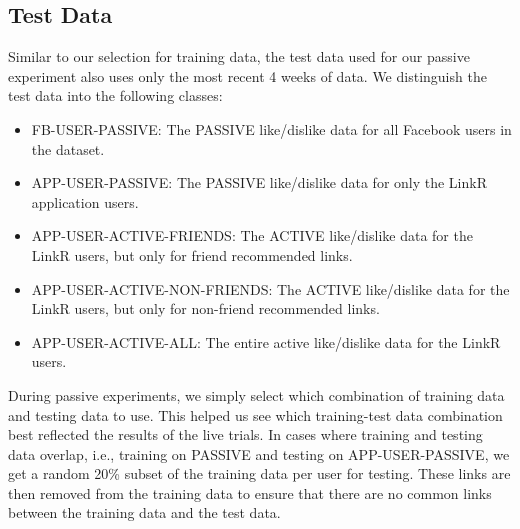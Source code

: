 \subsection{Test Data}

Similar to our selection for training data, the test data used for our passive experiment also uses only the most recent 4 weeks of data. We distinguish the test data into the following classes:

\begin{itemize}
\item{FB-USER-PASSIVE: The PASSIVE like/dislike data for all Facebook users in the dataset.}
\item{APP-USER-PASSIVE: The PASSIVE like/dislike data for only the LinkR application users.}
\item{APP-USER-ACTIVE-FRIENDS: The ACTIVE like/dislike data for the LinkR users, but only for friend recommended links.}
\item{APP-USER-ACTIVE-NON-FRIENDS: The ACTIVE like/dislike data for the LinkR users, but only for non-friend recommended links.}
\item{APP-USER-ACTIVE-ALL: The entire active like/dislike data for the LinkR users.}
\end{itemize}

During passive experiments, we simply select which combination of training data and testing data to use. This helped us see which training-test data combination best reflected the results of the live trials. %
In cases where training and testing data overlap, i.e., training on PASSIVE and testing on APP-USER-PASSIVE, we get a random 20\% subset of the training data per user for testing. These links are then removed from the training data to ensure that there are no common links between the training data and the test data.

